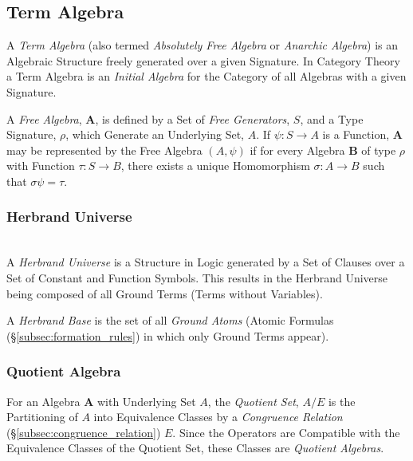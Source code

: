 \documentclass{article}
\begin{document}
\subsection{Term Algebra}\label{subsec:term_algebra}

A \emph{Term Algebra} (also termed \emph{Absolutely Free Algebra} or
\emph{Anarchic Algebra}) is an Algebraic Structure freely generated
over a given Signature. In Category Theory a Term Algebra is an
\emph{Initial Algebra} for the Category of all Algebras with a given
Signature.

A \emph{Free Algebra}, $\mathbf{A}$, is defined by a Set of \emph{Free
  Generators}, $S$, and a Type Signature, $\rho$, which Generate an
Underlying Set, $A$. If $\psi : S \rightarrow A$ is a Function,
$\mathbf{A}$ may be represented by the Free Algebra $(A,\psi)$ if for
every Algebra $\mathbf{B}$ of type $\rho$ with Function $\tau : S
\rightarrow B$, there exists a unique Homomorphism $\sigma : A
\rightarrow B$ such that $\sigma\psi = \tau$.

\subsubsection{Herbrand Universe}\label{subsec:herbrand_universe}
\hfill \\
A \emph{Herbrand Universe} is a Structure in Logic generated by a Set
of Clauses over a Set of Constant and Function Symbols. This results
in the Herbrand Universe being composed of all Ground Terms (Terms
without Variables).

A \emph{Herbrand Base} is the set of all \emph{Ground Atoms} (Atomic
Formulas (\S\ref{subsec:formation_rules}) in which only Ground Terms
appear).

\subsubsection{Quotient Algebra}\label{subsec:quotient_algebra}

For an Algebra $\mathbf{A}$ with Underlying Set $A$, the
\emph{Quotient Set}, $A / E$ is the Partitioning of $A$ into
Equivalence Classes by a \emph{Congruence Relation}
(\S\ref{subsec:congruence_relation}) $E$. Since the Operators are
Compatible with the Equivalence Classes of the Quotient Set, these
Classes are \emph{Quotient Algebras}.
\end{document}
